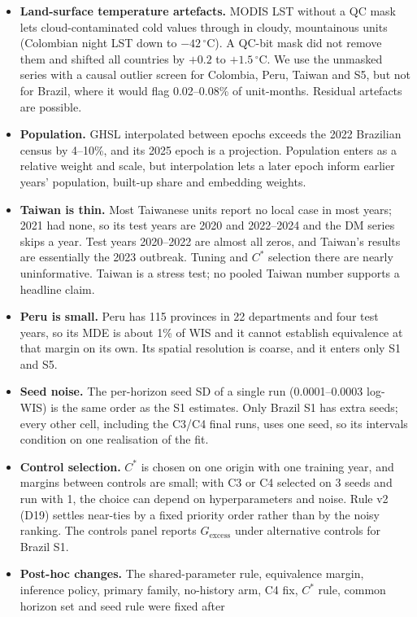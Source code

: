 \documentclass[11pt]{article}
\newcommand{\Gex}{G_{\mathrm{excess}}}
\newcommand{\Cstar}{C^{\ast}}
\begin{document}
\begin{itemize}
  references there.
  \item \textbf{Land-surface temperature artefacts.} MODIS LST without a QC mask lets cloud-contaminated
  cold values through in cloudy, mountainous units (Colombian night LST down to $-42\,^\circ$C). A QC-bit
  mask did not remove them and shifted all countries by $+0.2$ to $+1.5\,^\circ$C. We use the unmasked
  series with a causal outlier screen for Colombia, Peru, Taiwan and S5, but not for Brazil, where it would
  flag 0.02--0.08\% of unit-months. Residual artefacts are possible.
  \item \textbf{Population.} GHSL interpolated between epochs exceeds the 2022 Brazilian census by
  4--10\%, and its 2025 epoch is a projection. Population enters as a relative weight and scale, but
  interpolation lets a later epoch inform earlier years' population, built-up share and embedding weights.
  \item \textbf{Taiwan is thin.} Most Taiwanese units report no local case in most years; 2021 had none,
  so its test years are 2020 and 2022--2024 and the DM series skips a year. Test years 2020--2022 are almost
  all zeros, and Taiwan's results are essentially the 2023 outbreak. Tuning and $\Cstar$ selection there are
  nearly uninformative. Taiwan is a stress test; no pooled Taiwan number supports a headline claim.
  \item \textbf{Peru is small.} Peru has 115 provinces in 22 departments and four test years, so its MDE is
  about 1\% of WIS and it cannot establish equivalence at that margin on its own. Its spatial resolution is
  coarse, and it enters only S1 and S5.
  \item \textbf{Seed noise.} The per-horizon seed SD of a single run (0.0001--0.0003 log-WIS) is the same
  order as the S1 estimates. Only Brazil S1 has extra seeds; every other cell, including the C3/C4 final
  runs, uses one seed, so its intervals condition on one realisation of the fit.
  \item \textbf{Control selection.} $\Cstar$ is chosen on one origin with one training year, and margins
  between controls are small; with C3 or C4 selected on 3 seeds and run with 1, the choice can depend on
  hyperparameters and noise. Rule v2 (D19) settles near-ties by a fixed priority order rather than by the
  noisy ranking. The controls panel reports $\Gex$ under alternative controls for Brazil S1.
  \item \textbf{Post-hoc changes.} The shared-parameter rule, equivalence margin, inference policy,
  primary family, no-history arm, C4 fix, $\Cstar$ rule, common horizon set and seed rule were fixed after

\end{itemize}
\end{document}
